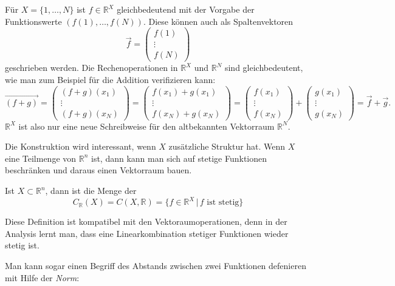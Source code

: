 \begin{beispiel}
Für $X=\{1,\dots,N\}$ ist $f\in \mathbb R^X$ gleichbedeutend mit
der Vorgabe der Funktionswerte $(f(1),\dots,f(N))$.
Diese können auch als Spaltenvektoren
\[
\vec{f} = \begin{pmatrix}f(1)\\\vdots\\f(N)\end{pmatrix}
\]
geschrieben werden.
Die Rechenoperationen in $\mathbb R^X$ und $\mathbb R^N$ sind gleichbedeutent,
wie man zum Beispiel für die Addition verifizieren kann:
\[
\overrightarrow{(f+g)}
=
\begin{pmatrix}
(f+g)(x_1)\\\vdots\\(f+g)(x_N)
\end{pmatrix}
=
\begin{pmatrix}
f(x_1)+g(x_1)\\\vdots\\f(x_N)+g(x_N)
\end{pmatrix}
=
\begin{pmatrix}
f(x_1)\\\vdots\\f(x_N)
\end{pmatrix}
+
\begin{pmatrix}
g(x_1)\\\vdots\\g(x_N)
\end{pmatrix}
=
\vec{f} + \vec{g}.
\]
$\mathbb R^X$ ist also nur eine neue Schreibweise für den altbekannten
Vektorraum $\mathbb R^N$.
\end{beispiel}

Die Konstruktion wird interessant, wenn $X$ zusätzliche Struktur hat.
Wenn $X$ eine Teilmenge von $\mathbb R^n$ ist, dann kann man sich auf
stetige Funktionen beschränken und daraus einen Vektorraum bauen.

\begin{definition}
Ist $X\subset\mathbb R^n$, dann ist die Menge der
\[
C_{\mathbb R}(X)
=
C(X,\mathbb R)
=
\{ f\in \mathbb R^X\,|\,\text{$f$ ist stetig}\}
\]
\end{definition}

Diese Definition ist kompatibel mit den Vektoraumoperationen,
denn in der Analysis lernt man, dass eine Linearkombination
stetiger Funktionen wieder stetig ist.

Man kann sogar einen Begriff des Abstands zwischen zwei Funktionen
defenieren mit Hilfe der {\em Norm}:

